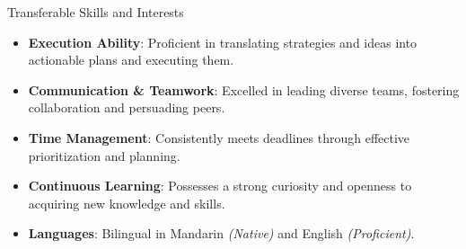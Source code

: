 \documentclass{resume} %
\begin{document}
\begin{rSection}{Transferable Skills and Interests}
\begin{itemize}
    \item \textbf{Execution Ability}: Proficient in translating strategies and ideas into actionable plans and executing them.
    \vspace{-0.2cm} \item \textbf{Communication \& Teamwork}: Excelled in leading diverse teams, fostering collaboration and persuading peers.
    \vspace{-0.2cm} \item \textbf{Time Management}: Consistently meets deadlines through effective prioritization and planning.
    \vspace{-0.2cm} \item \textbf{Continuous Learning}: Possesses a strong curiosity and openness to acquiring new knowledge and skills.
    \vspace{-0.2cm} \item \textbf{Languages}: Bilingual in Mandarin \textit{(Native)} and English \textit{(Proficient)}.
\end{itemize}
\end{rSection}
\end{document}
